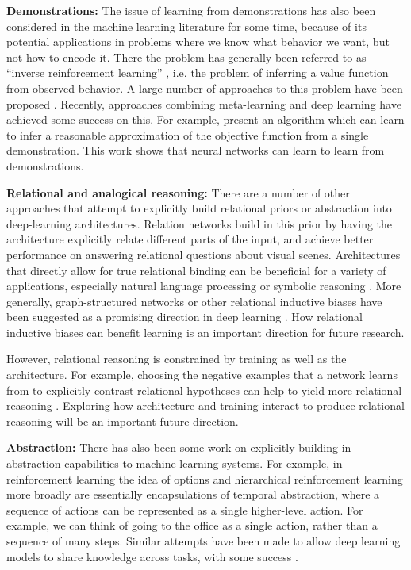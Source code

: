 \textbf{Demonstrations:} The issue of learning from demonstrations has also been considered in the machine learning literature for some time, because of its potential applications in problems where we know what behavior we want, but not how to encode it. There the problem has generally been referred to as ``inverse reinforcement learning'' \citep{Ng2000}, i.e. the problem of inferring a value function from observed behavior. A large number of approaches to this problem have been proposed \citep[e.g.][]{Ng2000, Abbeel2004}. Recently, approaches combining meta-learning and deep learning have achieved some success on this. For example, \citet{Finn2016} present an algorithm which can learn to infer a reasonable approximation of the objective function from a single demonstration. This work shows that neural networks can learn to learn from demonstrations. \par
\textbf{Relational and analogical reasoning:} There are a number of other approaches that attempt to explicitly build relational priors or abstraction into deep-learning architectures. Relation networks \citep{Santoro2017} build in this prior by having the architecture explicitly relate different parts of the input, and achieve better performance on answering relational questions about visual scenes. Architectures that directly allow for true relational binding can be beneficial for a variety of applications, especially natural language processing or symbolic reasoning \citep[e.g.][]{Smolensky1990, Smolensky2014, Huang2017}. More generally, graph-structured networks or other relational inductive biases have been suggested as a promising direction in deep learning \citep{Battaglia2018}. How relational inductive biases can benefit learning is an important direction for future research. \par 
However, relational reasoning is constrained by training as well as the architecture. For example, choosing the negative examples that a network learns from to explicitly contrast relational hypotheses can help to yield more relational reasoning \citep{Hill2019}. Exploring how architecture and training interact to produce relational reasoning will be an important future direction. \par
\textbf{Abstraction:} There has also been some work on explicitly building in abstraction capabilities to machine learning systems. For example, in reinforcement learning the idea of options \citep{Sutton1999} and hierarchical reinforcement learning more broadly \citep[e.g.][]{Botvinick2009} are essentially encapsulations of temporal abstraction, where a sequence of actions can be represented as a single higher-level action. For example, we can think of going to the office as a single action, rather than a sequence of many steps. Similar attempts have been made to allow deep learning models to share knowledge across tasks, with some success \citep[e.g.][]{Tessler2016}. \par 
